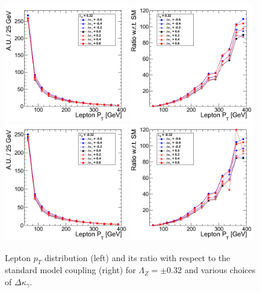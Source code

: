 \begin{figure}[h!t]
  {\centering
    \includegraphics[width=0.48\textwidth]{figs/LeptonpT_032.png}
    \includegraphics[width=0.48\textwidth]{figs/LeptonpT_032_ratio.png}
    \includegraphics[width=0.48\textwidth]{figs/LeptonpT_m032.png}
    \includegraphics[width=0.48\textwidth]{figs/LeptonpT_m032_ratio.png}
    \caption{Lepton $p_T$ distribution (left) and its ratio with respect to 
    the standard model coupling (right) for $\Lambda_Z = \pm 0.32$ and various choices of $\Delta{\kappa_\gamma}$.}
    \label{fig:ww_LeptonpT_atgcRatio032}}
\end{figure}
